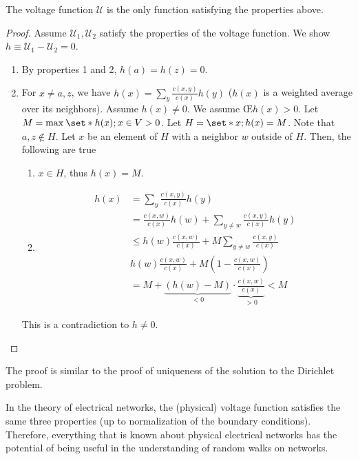 \begin{lem}
    The voltage function $\mathcal{U}$ is the only function satisfying the properties above.
\end{lem}
\begin{proof}
    Assume $\mathcal{U}_1,\mathcal{U}_2$ satisfy the properties of the voltage function. We show $h \equiv \mathcal{U}_1-\mathcal{U}_2=0$. 
    \begin{enumerate}
      \item By properties 1 and 2, $h(a)=h(z)=0$. 
      \item For $x\neq a,z$, we have \(h(x) = \sum_y \frac{c(x,y)}{c(x)} h(y)\) ($h(x)$ is a weighted average over its neighbors). Assume $h(x) \neq 0$. We assume \OE $h(x) >0$. Let \(M=\max_{}\set*{h(x); x\in V}>0\). Let \(H= \set*{x; h(x)=M}\). Note that $a,z \notin H$. Let $x$ be an element of $H$ with a neighbor $w$ outside of  $H$. Then, the following are true
        \begin{enumerate}
            \item $x\in H$, thus $h(x)=M$.
            \item 
              \begin{align*}
                h(x)  &=\sum_y \frac{c(x,y)}{c(x)} h(y) \\
                     &=\frac{c(x,w)}{c(x)}h(w) + \sum_{y\neq w} \frac{c(x,y)}{c(x)}h(y) \\
                     &\leq h(w) \frac{c(x,w)}{c(x)} + M \sum_{y\neq w} \frac{c(x,y)}{c(x)} \\
                     & h(w) \frac{c(x,w)}{c(x)} + M \left(1-\frac{c(x,w)}{c(x)}\right) \\
                     &=M + \underbrace{ \left(h(w)-M\right)}_{<0}\cdot \underbrace{\frac{c(x,w)}{c(x)}}_{>0} < M
              \end{align*}
              
        \end{enumerate}
        This is a contradiction to $h \neq 0$.
    \end{enumerate}
\end{proof}

\begin{remark}
    The proof is similar to the proof of uniqueness of the solution to the Dirichlet problem.
\end{remark}

\begin{remark}
    In the theory of electrical networks, the (physical) voltage function satisfies the same three properties (up to normalization of the boundary conditions). Therefore, everything that is known about physical electrical networks has the potential of being useful in the understanding of random walks on networks.
\end{remark}


